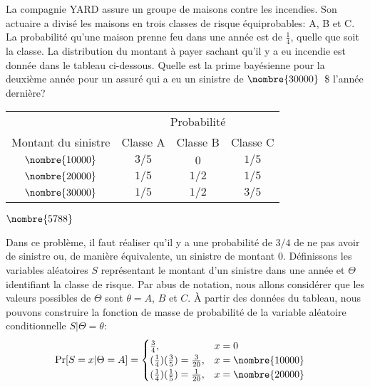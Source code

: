 \begin{exercice}
  \label{exercice:bayesienne:YARD}
  La compagnie YARD assure un groupe de maisons contre les incendies.
  Son actuaire a divisé les maisons en trois classes de risque
  équiprobables: A, B et C. La probabilité qu'une maison prenne feu
  dans une année est de $\frac{1}{4}$, quelle que soit la classe. La
  distribution du montant à payer sachant qu'il y a eu incendie est
  donnée dans le tableau ci-dessous.  Quelle est la prime bayésienne
  pour la deuxième année pour un assuré qui a eu un sinistre de
  $\nombre{30000}$~\$ l'année dernière?
  \begin{center}
    \begin{tabular}{cccc}
      \toprule
      & \multicolumn{3}{c}{Probabilité} \\
      \cmidrule{2-4}
      Montant du sinistre & Classe A & Classe B & Classe C \\
      \midrule
      $\nombre{10000}$ & $3/5$ & $0$   & $1/5$ \\
      $\nombre{20000}$ & $1/5$ & $1/2$ & $1/5$ \\
      $\nombre{30000}$ & $1/5$ & $1/2$ & $3/5$ \\
      \bottomrule
    \end{tabular}
  \end{center}
  \begin{rep}
    $\nombre{5788}$
  \end{rep}
  \begin{sol}
    Dans ce problème, il faut réaliser qu'il y a une probabilité de
    $3/4$ de ne pas avoir de sinistre ou, de manière équivalente, un
    sinistre de montant $0$. Définissons les variables aléatoires $S$
    représentant le montant d'un sinistre dans une année et $\Theta$
    identifiant la classe de risque. Par abus de notation, nous allons
    considérer que les valeurs possibles de $\Theta$ sont
    $\theta = A$, $B$ et $C$. À partir des données du tableau, nous
    pouvons construire la fonction de masse de probabilité de la
    variable aléatoire conditionnelle $S|\Theta = \theta$:
    \begin{align*}
      \Pr[S = x|\Theta = A]
      &=
      \begin{cases}
        \frac{3}{4}, & x = 0 \\
        (\frac{1}{4}) (\frac{3}{5}) = \frac{3}{20}, & x = \nombre{10000} \\
        (\frac{1}{4}) (\frac{1}{5}) = \frac{1}{20}, & x = \nombre{20000} \\

\end{cases}
\end{align*}
\end{sol}
\end{exercice}
